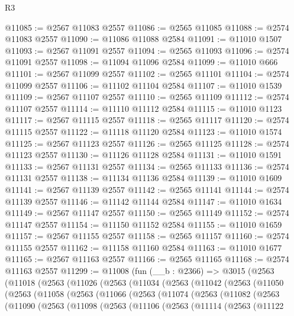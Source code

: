 \begin{lexlean}{R3}
\begin{coremodule}
@11085 := @2567 @11083 @2557
@11086 := @2565 @11085
@11088 := @2574 @11083 @2557
@11090 := @11086 @11088 @2584
@11091 := @11010 @1507
@11093 := @2567 @11091 @2557
@11094 := @2565 @11093
@11096 := @2574 @11091 @2557
@11098 := @11094 @11096 @2584
@11099 := @11010 @666
@11101 := @2567 @11099 @2557
@11102 := @2565 @11101
@11104 := @2574 @11099 @2557
@11106 := @11102 @11104 @2584
@11107 := @11010 @1539
@11109 := @2567 @11107 @2557
@11110 := @2565 @11109
@11112 := @2574 @11107 @2557
@11114 := @11110 @11112 @2584
@11115 := @11010 @1123
@11117 := @2567 @11115 @2557
@11118 := @2565 @11117
@11120 := @2574 @11115 @2557
@11122 := @11118 @11120 @2584
@11123 := @11010 @1574
@11125 := @2567 @11123 @2557
@11126 := @2565 @11125
@11128 := @2574 @11123 @2557
@11130 := @11126 @11128 @2584
@11131 := @11010 @1591
@11133 := @2567 @11131 @2557
@11134 := @2565 @11133
@11136 := @2574 @11131 @2557
@11138 := @11134 @11136 @2584
@11139 := @11010 @1609
@11141 := @2567 @11139 @2557
@11142 := @2565 @11141
@11144 := @2574 @11139 @2557
@11146 := @11142 @11144 @2584
@11147 := @11010 @1634
@11149 := @2567 @11147 @2557
@11150 := @2565 @11149
@11152 := @2574 @11147 @2557
@11154 := @11150 @11152 @2584
@11155 := @11010 @1659
@11157 := @2567 @11155 @2557
@11158 := @2565 @11157
@11160 := @2574 @11155 @2557
@11162 := @11158 @11160 @2584
@11163 := @11010 @1677
@11165 := @2567 @11163 @2557
@11166 := @2565 @11165
@11168 := @2574 @11163 @2557
@11299 := @11008
    (fun (__b : @2366) =>
    @3015
      (@2563
        (@11018
          (@2563
            (@11026
              (@2563
                (@11034
                  (@2563
                    (@11042
                      (@2563
                        (@11050
                          (@2563
                            (@11058
                              (@2563
                                (@11066
                                  (@2563
                                    (@11074
                                      (@2563
                                        (@11082
                                          (@2563
                                            (@11090
                                              (@2563
                                                (@11098
                                                  (@2563
                                                    (@11106
                                                      (@2563
                                                        (@11114
                                                          (@2563
                                                            (@11122

\end{coremodule}
\end{lexlean}
